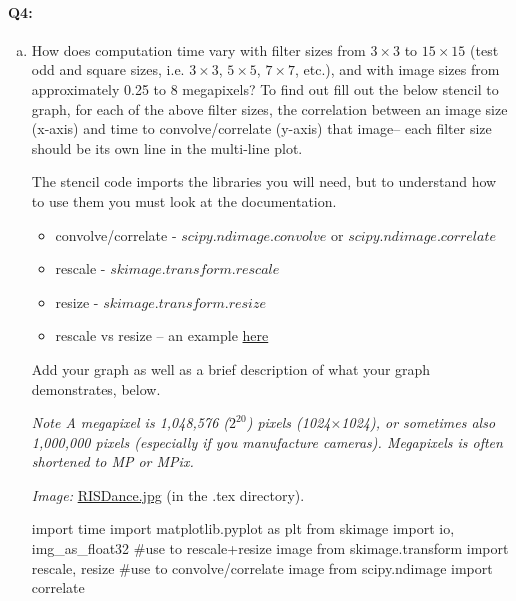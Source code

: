 
\pagebreak
\paragraph{Q4:} 
\begin{enumerate}[(a)]
    \item 
    How does computation time vary with filter sizes from $3\times3$ to $15\times15$ (test odd and square sizes, i.e. $3\times3$, $5\times5$, $7\times7$, etc.), and with image sizes from approximately 0.25 to 8 megapixels? To find out fill out the below stencil to graph, for each of the above filter sizes, the correlation between an image size (x-axis) and time to convolve/correlate (y-axis) that image– each filter size should be its own line in the multi-line plot. 
    
    The stencil code imports the libraries you will need, but to understand how to use them you must look at the documentation.
    \begin{itemize}
    \item convolve/correlate - \href{https://docs.scipy.org/doc/scipy/reference/generated/scipy.ndimage.convolve.html}{$scipy.ndimage.convolve$} or \href{https://docs.scipy.org/doc/scipy/reference/generated/scipy.ndimage.correlate.html}{$scipy.ndimage.correlate$}
    \item rescale - \href{https://scikit-image.org/docs/dev/api/skimage.transform.html#skimage.transform.rescale}{$skimage.transform.rescale$}
    \item resize - \href{https://scikit-image.org/docs/dev/api/skimage.transform.html#skimage.transform.resize}{$skimage.transform.resize$}
    \item rescale vs resize – an example \href{http://scikit-image.org/docs/dev/auto_examples/transform/plot_rescale.html}{here}
    \end{itemize} 

    
    Add your graph as well as a brief description of what your graph demonstrates, below.

\emph{Note A megapixel is 1,048,576 ($2^{20}$) pixels (1024$\times$1024), or sometimes also 1,000,000 pixels (especially if you manufacture cameras). Megapixels is often shortened to MP or MPix.}

\emph{Image:} \href{RISDance.jpg}{RISDance.jpg} (in the .tex directory).

\begin{python}
import time 
import matplotlib.pyplot as plt
from skimage import io, img_as_float32
#use to rescale+resize image
from skimage.transform import rescale, resize
#use to convolve/correlate image
from scipy.ndimage import correlate


\end{python}
\end{enumerate}
